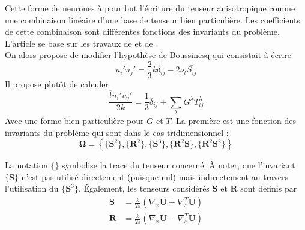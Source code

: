 \documentclass[a4paper,12pt]{report}
\numberwithin{equation}{section} %
\begin{document}
\noindent Cette forme de neurones à pour but l'écriture du tenseur anisotropique comme une combinaison linéaire d'une base de tenseur bien particulière.  Les coefficients de cette combinaison sont différentes fonctions des invariants du problème. L'article se base sur les travaux de \cite{pope1975more} et de \cite{smith1965isotropic}.\\
On alors propose de modifier l'hypothèse de Boussinesq qui consistait à écrire 
\begin{equation*}
\overline{u_i' u_j'} = \frac{2}{3} k \delta_{ij} - 2 \nu_t \bar{S_{ij}}
\end{equation*}
 Il propose plutôt de calculer 
\begin{equation*}
\frac{\overline!{u_i' u_j'} }{2k}= \frac{1}{3} \delta_{ij} + \sum_\lambda G^\lambda T^\lambda_{ij} 
\end{equation*}
Avec une forme bien particulière pour $G$ et $T$. La première est une fonction des invariants du problème qui sont dans le cas tridimensionnel : 
\begin{equation*}
\mathbf{\Omega}= \left \{ \{\textbf{S}^2\}, \{\textbf{R}^2\}, \{\textbf{S}^3\}, \{\textbf{R}^2\textbf{S}\}, \{\textbf{R}^2 \textbf{S}^2\}\right \} 
\end{equation*}

\noindent La notation $\textbf{\{\}}$ symbolise la trace du tenseur concerné. À noter, que l'invariant $\{\textbf{S}\}$ n'est pas utilisé directement (puisque nul) mais indirectement au travers l'utilisation du $\{\textbf{S}^3\}$. Également, les tenseurs considérés $\textbf{S}$ et $\textbf{R}$ sont définis par 
\begin{align*}
\textbf{S} &= \frac{k}{2\varepsilon}\left(\nabla_x\textbf{U} + \nabla^T_x\textbf{U} \right) \\[0.2cm]
\textbf{R} &= \frac{k}{2 \varepsilon}\left(\nabla_x\textbf{U} - \nabla^T_x\textbf{U} \right) 
\end{align*}

\pagebreak 
\end{document}
